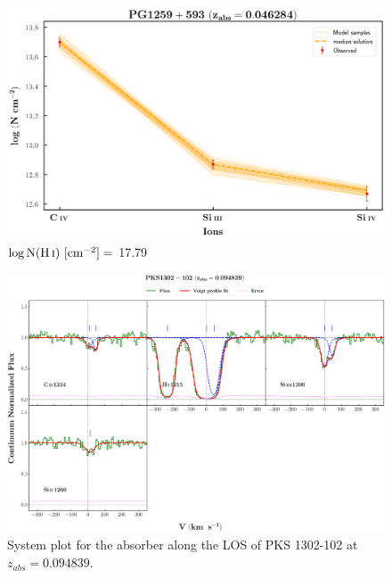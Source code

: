  \begin{figure}[!h]
      \centering
      \includegraphics[width=0.9\linewidth]{Ionisation-Modelling-Plots/pg1259-z=0.046284-compII_logZ=-1.png}
      \caption{$\log \text{N}(\ion{H}{i}) \ [\text{cm}^{-2}]=$ 17.79}
  \end{figure}
  
  
  \newpage
  
  \begin{landscape}
  
  \begin{figure}
      \centering
      \vspace{-20mm}
      \hspace*{-35mm}
      \includegraphics[width=1.25\linewidth]{System-Plots/PKS1302-102_z=0.094839_sys_plot.png}
      \caption{System plot for the absorber along the LOS of PKS 1302-102 at $z_{abs} = 0.094839$. }
  \end{figure}
  
  \end{landscape}
  
